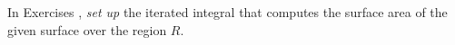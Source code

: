 {\noindent In Exercises} 
{,  \textit{set up} the iterated integral that computes the surface area of the given surface over the region $R$.
}
